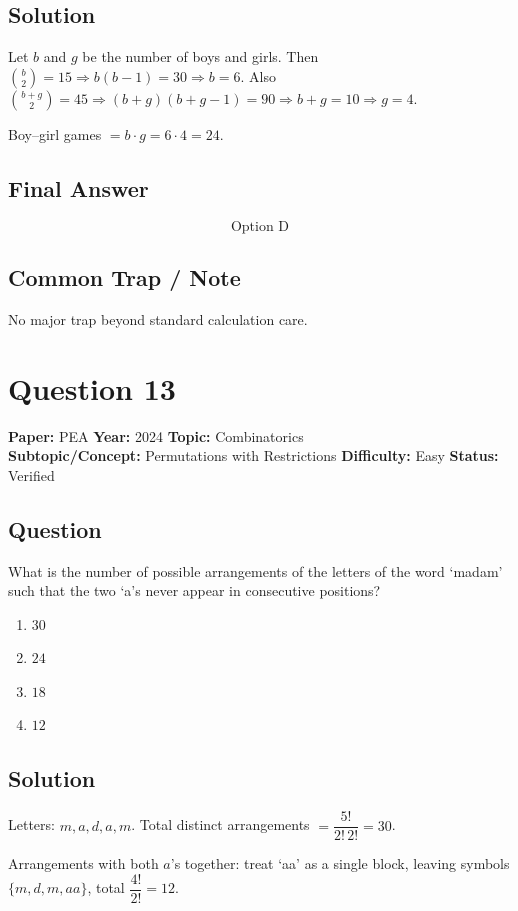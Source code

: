 \documentclass[11pt]{article}
\begin{document}
\subsection*{Solution}
Let $b$ and $g$ be the number of boys and girls. Then $\binom{b}{2}=15\Rightarrow b(b-1)=30\Rightarrow b=6$. Also $\binom{b+g}{2}=45\Rightarrow (b+g)(b+g-1)=90\Rightarrow b+g=10\Rightarrow g=4$.

Boy--girl games $=b\cdot g=6\cdot 4=24$.

\subsection*{Final Answer}
\[
\boxed{\text{Option D}}
\]

\subsection*{Common Trap / Note}
No major trap beyond standard calculation care.

\section*{Question 13}
\textbf{Paper:} PEA \quad \textbf{Year:} 2024 \quad \textbf{Topic:} Combinatorics \\
\textbf{Subtopic/Concept:} Permutations with Restrictions \quad \textbf{Difficulty:} Easy \quad \textbf{Status:} Verified

\subsection*{Question}
What is the number of possible arrangements of the letters of the word `madam' such that the two `a's never appear in consecutive positions?
\begin{enumerate}[label=(\Alph*)]
\item $30$
\item $24$
\item $18$
\item $12$
\end{enumerate}

\subsection*{Solution}
Letters: $m,a,d,a,m$. Total distinct arrangements $=\dfrac{5!}{2!\,2!}=30$.

Arrangements with both $a$'s together: treat `aa' as a single block, leaving symbols $\{m,d,m,aa\}$, total $\dfrac{4!}{2!}=12$.
\end{document}
